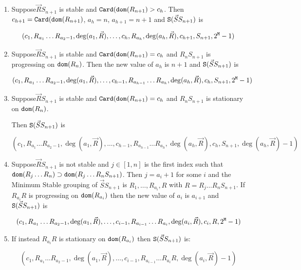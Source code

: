 \documentclass{lmcs}
\begin{document}
\begin{enumerate}
\item
Suppose$ \vec{R}S_{n+1}$ is stable and ${\tt Card}({\tt dom}(R_{n+1})> c_h$. Then
$c_{h+1} = {\tt Card}({\tt dom}(R_{n+1})$, $a_h = n$, $a_{h+1} = n+1$ and 
${\tt S}(\vec{S}S_{n+1})$ is 

$$
(c_1, R_{a_1}\ldots R_{a_2-1}, \deg(a_1,\vec{R}), 
\ldots,
c_h, R_{a_h}, \deg(a_h,\vec{R}),
c_{h+1}, S_{n+1}, 2^{{\tt M}} - 1)
$$

\item
Suppose$ \vec{R}S_{n+1}$ is stable and ${\tt Card}({\tt dom}(R_{n+1})= c_h$
and $R_n S_{n+1}$ is progressing on ${\tt dom}(R_{n})$.
Then the new value of $a_h$ is $n+1$ and ${\tt S}(\vec{S}S_{n+1})$ is 

$$
(c_1, R_{a_1}\ldots R_{a_2-1}, \deg(a_1,\vec{R}), 
\ldots,
c_{h-1}, R_{a_{h-1}}\ldots R_{a_h}, \deg(a_h,\vec{R}),
c_{h}, S_{n+1}, 2^{{\tt M}} - 1)
$$

\item
Suppose$ \vec{R}S_{n+1}$ is stable and ${\tt Card}({\tt dom}(R_{n+1})= c_h$
and $R_n S_{n+1}$ is stationary on ${\tt dom}(R_{n})$.

Then ${\tt S}(\vec{S}S_{n+1})$ is 

$$
(c_1, R_{a_1}\ldots R_{a_2-1}, \deg(a_1,\vec{R}), 
\ldots,
c_{h-1}, R_{a_{h-1}}\ldots R_{a_h}, \deg(a_h,\vec{R}),
c_{h}, S_{n+1}, \deg(a_h,\vec{R}) - 1)
$$

\item
Suppose$ \vec{R}S_{n+1}$ is not stable and $j \in [1,n]$ is the first index
such that ${\tt dom}(R_j \ldots R_n) \supset {\tt dom}(R_j \ldots R_n S_{n+1})$.
Then $j = a_i + 1$ for some $i$ and the Minimum Stable grouping of $\vec{S}S_{n+1}$
is $R_1, \ldots, R_{a_i}, R$ with $R = R_j \ldots R_n S_{n+1}$. If $R_{a_i} R$
is progressing on ${\tt dom}(R_{a_i})$ then the new value of $a_i$ is
$a_{i+1}$ and ${\tt S}(\vec{S}S_{n+1})$ is 

$$
(c_1, R_{a_1}\ldots R_{a_2-1}, \deg(a_1,\vec{R}), 
\ldots,
c_{i-1}, R_{a_{i-1}}\ldots R_{a_i}, \deg(a_i,\vec{R}),
c_{i}, R, 2^{{\tt M}}-1)
$$

\item
If instead $R_{a_i} R$
is stationary on ${\tt dom}(R_{a_i})$ then ${\tt S}(\vec{S}S_{n+1})$ is:

$$
(c_1, R_{a_1}\ldots R_{a_2-1}, \deg(a_1,\vec{R}), 
\ldots,
c_{i-1}, R_{a_{i-1}}\ldots R_{a_i}R, \deg(a_i,\vec{R})-1)
$$

\end{enumerate}
\end{document}
